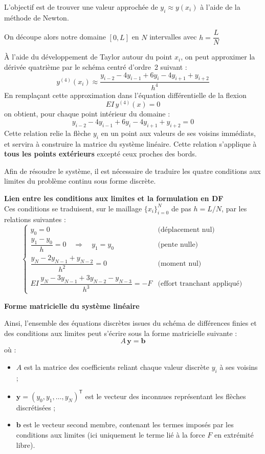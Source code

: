 \documentclass[12pt, a4paper]{article}
\begin{document}
L'objectif est de trouver une valeur approchée de  $y_i \approx y(x_i)$ à l'aide de la méthode de Newton. 

On découpe alors notre domaine $[0,L]$ en $N$ intervalles avec $h = \dfrac{L}{N}$

À l’aide du développement de Taylor autour du point $x_i$, on peut approximer la dérivée quatrième par le schéma centré d’ordre~2 suivant :
\[
y^{(4)}(x_i) \approx \frac{y_{i-2} - 4y_{i-1} + 6y_i - 4y_{i+1} + y_{i+2}}{h^4}
\]
En remplaçant cette approximation dans l’équation différentielle de la flexion
\[
EI\,y^{(4)}(x) = 0
\]
on obtient, pour chaque point intérieur du domaine :
\[
y_{i-2} - 4y_{i-1} + 6y_i - 4y_{i+1} + y_{i+2} = 0
\]
Cette relation relie la flèche $y_i$ en un point aux valeurs de ses voisins immédiats, et servira à construire la matrice du système linéaire. Cette relation s'applique à \textbf{tous les points extérieurs} excepté ceux proches des bords.

Afin de résoudre le système, il est nécessaire de traduire les quatre conditions aux limites du problème continu sous forme discrète.

\textbf{Lien entre les conditions aux limites et la formulation en DF}\\

Ces conditions se traduisent, sur le maillage $\{x_i\}_{i=0}^N$ de pas $h = L/N$, par les relations suivantes :
\[
\begin{cases}
y_0 = 0 & \text{(déplacement nul)} \\[6pt]
\dfrac{y_1 - y_0}{h} = 0 \quad \Rightarrow \quad y_1 = y_0 & \text{(pente nulle)} \\[10pt]
\dfrac{y_N - 2y_{N-1} + y_{N-2}}{h^2} = 0 & \text{(moment nul)} \\[12pt]
EI\,\dfrac{y_N - 3y_{N-1} + 3y_{N-2} - y_{N-3}}{h^3} = -F & \text{(effort tranchant appliqué)}
\end{cases}
\]

\textbf{Forme matricielle du système linéaire}

Ainsi, l’ensemble des équations discrètes issues du schéma de différences finies et des conditions aux limites peut s’écrire sous la forme matricielle suivante :
\[
A\,\mathbf{y} = \mathbf{b}
\]
où :
\begin{itemize}
  \item $A$ est la matrice des coefficients reliant chaque valeur discrète $y_i$ à ses voisins ;
  \item $\mathbf{y} = (y_0, y_1, \dots, y_N)^{\mathsf{T}}$ est le vecteur des inconnues représentant les flèches discrétisées ;
  \item $\mathbf{b}$ est le vecteur second membre, contenant les termes imposés par les conditions aux limites (ici uniquement le terme lié à la force $F$ en extrémité libre).
\end{itemize}
\end{document}
